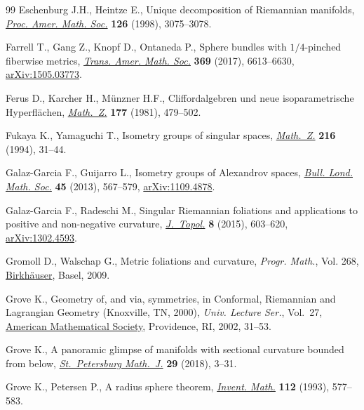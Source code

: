 \documentclass[10pt,a4paper]{amsart}
\numberwithin{equation}{section}
\theoremstyle{definition}
\begin{document}
\begin{thebibliography}{99}
Eschenburg J.H., Heintze E., Unique decomposition of {R}iemannian manifolds,
 \href{https://doi.org/10.1090/S0002-9939-98-04630-9}{\textit{Proc. Amer.
 Math. Soc.}} \textbf{126} (1998), 3075--3078.

Farrell T., Gang Z., Knopf D., Ontaneda P., Sphere bundles with {$1/4$}-pinched
 fiberwise metrics, \href{https://doi.org/10.1090/tran/6993}{\textit{Trans.
 Amer. Math. Soc.}} \textbf{369} (2017), 6613--6630,
 \href{http://arxiv.org/abs/1505.03773}{arXiv:1505.03773}.

Ferus D., Karcher H., M\"unzner H.F., Cliffordalgebren und neue
 isoparametrische {H}yperfl\"achen,
 \href{https://doi.org/10.1007/BF01219082}{\textit{Math.~Z.}} \textbf{177}
 (1981), 479--502.

Fukaya K., Yamaguchi T., Isometry groups of singular spaces,
 \href{https://doi.org/10.1007/BF02572307}{\textit{Math.~Z.}} \textbf{216}
 (1994), 31--44.

Galaz-Garcia F., Guijarro L., Isometry groups of {A}lexandrov spaces,
 \href{https://doi.org/10.1112/blms/bds101}{\textit{Bull. Lond. Math. Soc.}}
 \textbf{45} (2013), 567--579,
 \href{http://arxiv.org/abs/1109.4878}{arXiv:1109.4878}.

Galaz-Garcia F., Radeschi M., Singular {R}iemannian foliations and applications
 to positive and non-negative curvature,
 \href{https://doi.org/10.1112/jtopol/jtv004}{\textit{J.~Topol.}} \textbf{8}
 (2015), 603--620, \href{http://arxiv.org/abs/1302.4593}{arXiv:1302.4593}.

Gromoll D., Walschap G., Metric foliations and curvature, \textit{Progr.
 Math.}, Vol. 268,
 \href{https://doi.org/10.1007/978-3-7643-8715-0}{Birkh\"auser}, Basel, 2009.

Grove K., Geometry of, and via, symmetries, in Conformal, {R}iemannian and
 {L}agrangian {G}eometry ({K}noxville, {TN}, 2000), \textit{Univ. Lecture
 Ser.}, Vol.~27, \href{https://doi.org/10.1090/ulect/027/02}{American
 Mathematical Society}, Providence, RI, 2002, 31--53.

Grove K., A panoramic glimpse of manifolds with sectional curvature bounded
 from below, \href{https://doi.org/10.1090/spmj/1479}{\textit{St.~Petersburg
 Math.~J.}} \textbf{29} (2018), 3--31.

Grove K., Petersen P., A radius sphere theorem,
 \href{https://doi.org/10.1007/BF01232447}{\textit{Invent. Math.}}
 \textbf{112} (1993), 577--583.


\end{thebibliography}
\end{document}
